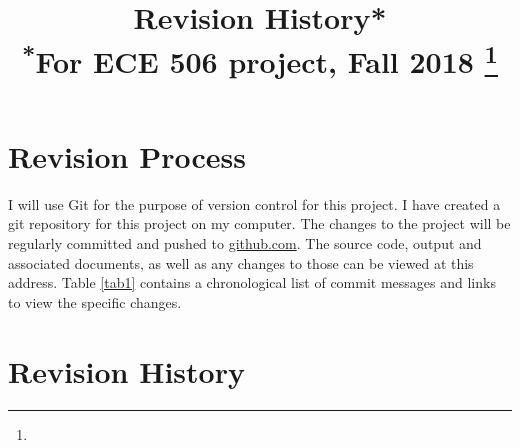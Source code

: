 \documentclass[conference]{IEEEtran}
\begin{document}
\title{Revision History*\\
{\footnotesize \textsuperscript{*}For ECE 506 project, Fall 2018}
\thanks{}
}

\author{
}

\onecolumn

\maketitle

\section{Revision Process}
I will use Git for the purpose of version control for this project. I have created a git repository for this project on my computer. The changes to the project will be regularly committed and pushed to \href{https://github.com/esalman/optimization_project/}{github.com}. The source code, output and associated documents, as well as any changes to those can be viewed at this address. Table \ref{tab1} contains a chronological list of commit messages and links to view the specific changes.

\section{Revision History}
\end{document}
